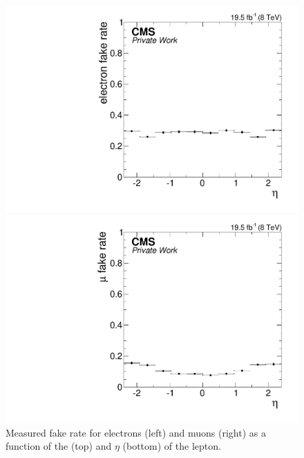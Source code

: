 \begin{figure}[htbp]
\begin{minipage}[t]{0.49\textwidth}
\includegraphics[width=\textwidth]{plots/BG/nonPrompt/fakeRate_ele_Inclusive_Full2012_TrailingEta_None.pdf}
\end{minipage}
\begin{minipage}[t]{0.49\textwidth}
\includegraphics[width=\textwidth]{plots/BG/nonPrompt/fakeRate_mu_Inclusive_Full2012_TrailingEta_None.pdf}
\end{minipage}
\caption{Measured fake rate for electrons (left) and muons (right) as a function of the \pt (top) and $\eta$ (bottom) of the lepton.}
\label{fig:fakeRate}
\end{figure} 

